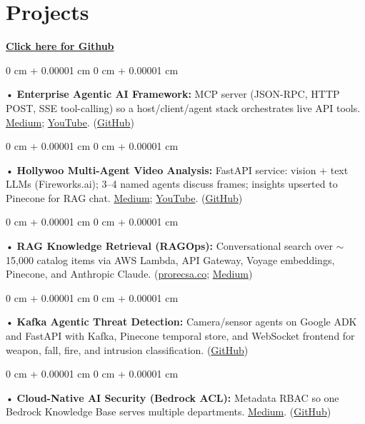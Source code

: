 \documentclass[10pt, letterpaper]{article}
\newenvironment{onecolentry}{
    \begin{adjustwidth}{
        0 cm + 0.00001 cm
    }{
        0 cm + 0.00001 cm
    }
}{
    \end{adjustwidth}
} %
\begin{document}
\section{Projects}
    \vspace{2 pt}
\textbf{\href{https://github.com/daedalus-s}{Click here for Github}}
\begin{onecolentry}
     • \textbf{Enterprise Agentic AI Framework:} MCP server (JSON-RPC, HTTP POST, SSE tool-calling) so a host/client/agent stack orchestrates live API tools. \href{https://medium.com/@sreenikethaathreya/get-good-at-using-ai-noob-5d2576203112}{Medium}; \href{https://www.youtube.com/watch?v=op2gTYyFb5U}{YouTube}. (\href{https://github.com/daedalus-s/dota2-mcp-server}{GitHub})
\end{onecolentry}
\begin{onecolentry}
     • \textbf{Hollywoo Multi-Agent Video Analysis:} FastAPI service: vision + text LLMs (Fireworks.ai); 3--4 named agents discuss frames; insights upserted to Pinecone for RAG chat. \href{https://medium.com/@sreenikethaathreya/hollywoo-ai-video-analysis-5eae37ca7e16}{Medium}; \href{https://www.youtube.com/watch?v=KBs_3V0OAgU}{YouTube}. (\href{https://github.com/daedalus-s/fireworks-video-discussion}{GitHub})
\end{onecolentry}
\begin{onecolentry}
     • \textbf{RAG Knowledge Retrieval (RAGOps):} Conversational search over $\sim$15,000 catalog items via AWS Lambda, API Gateway, Voyage embeddings, Pinecone, and Anthropic Claude. (\href{https://prorecsa.co}{prorecsa.co}; \href{https://medium.com/@sreenikethaathreya/from-rags-to-riches-bba8a671d5e6}{Medium})
\end{onecolentry}
\begin{onecolentry}
     • \textbf{Kafka Agentic Threat Detection:} Camera/sensor agents on Google ADK and FastAPI with Kafka, Pinecone temporal store, and WebSocket frontend for weapon, fall, fire, and intrusion classification. (\href{https://github.com/daedalus-s/threat-detection-gdg}{GitHub})
\end{onecolentry}
\begin{onecolentry}
     • \textbf{Cloud-Native AI Security (Bedrock ACL):} Metadata RBAC so one Bedrock Knowledge Base serves multiple departments. \href{https://medium.com/@sreenikethaathreya/building-a-permission-aware-genai-application-on-amazon-bedrock-8fdc2410dd43}{Medium}. (\href{https://github.com/daedalus-s/bedrock-acl-metadata}{GitHub})
\end{onecolentry}
\vspace{2 pt}
\end{document}
